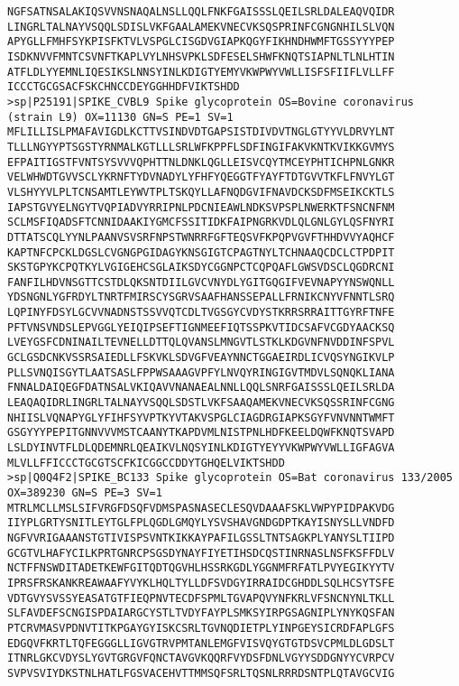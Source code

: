 \documentclass[en,black,12pt,normal]{elegantnote}
\begin{document}
\begin{lstlisting}
NGFSATNSALAKIQSVVNSNAQALNSLLQQLFNKFGAISSSLQEILSRLDALEAQVQIDR
LINGRLTALNAYVSQQLSDISLVKFGAALAMEKVNECVKSQSPRINFCGNGNHILSLVQN
APYGLLFMHFSYKPISFKTVLVSPGLCISGDVGIAPKQGYFIKHNDHWMFTGSSYYYPEP
ISDKNVVFMNTCSVNFTKAPLVYLNHSVPKLSDFESELSHWFKNQTSIAPNLTLNLHTIN
ATFLDLYYEMNLIQESIKSLNNSYINLKDIGTYEMYVKWPWYVWLLISFSFIIFLVLLFF
ICCCTGCGSACFSKCHNCCDEYGGHHDFVIKTSHDD
>sp|P25191|SPIKE_CVBL9 Spike glycoprotein OS=Bovine coronavirus (strain L9) OX=11130 GN=S PE=1 SV=1
MFLILLISLPMAFAVIGDLKCTTVSINDVDTGAPSISTDIVDVTNGLGTYYVLDRVYLNT
TLLLNGYYPTSGSTYRNMALKGTLLLSRLWFKPPFLSDFINGIFAKVKNTKVIKKGVMYS
EFPAITIGSTFVNTSYSVVVQPHTTNLDNKLQGLLEISVCQYTMCEYPHTICHPNLGNKR
VELWHWDTGVVSCLYKRNFTYDVNADYLYFHFYQEGGTFYAYFTDTGVVTKFLFNVYLGT
VLSHYYVLPLTCNSAMTLEYWVTPLTSKQYLLAFNQDGVIFNAVDCKSDFMSEIKCKTLS
IAPSTGVYELNGYTVQPIADVYRRIPNLPDCNIEAWLNDKSVPSPLNWERKTFSNCNFNM
SCLMSFIQADSFTCNNIDAAKIYGMCFSSITIDKFAIPNGRKVDLQLGNLGYLQSFNYRI
DTTATSCQLYYNLPAANVSVSRFNPSTWNRRFGFTEQSVFKPQPVGVFTHHDVVYAQHCF
KAPTNFCPCKLDGSLCVGNGPGIDAGYKNSGIGTCPAGTNYLTCHNAAQCDCLCTPDPIT
SKSTGPYKCPQTKYLVGIGEHCSGLAIKSDYCGGNPCTCQPQAFLGWSVDSCLQGDRCNI
FANFILHDVNSGTTCSTDLQKSNTDIILGVCVNYDLYGITGQGIFVEVNAPYYNSWQNLL
YDSNGNLYGFRDYLTNRTFMIRSCYSGRVSAAFHANSSEPALLFRNIKCNYVFNNTLSRQ
LQPINYFDSYLGCVVNADNSTSSVVQTCDLTVGSGYCVDYSTKRRSRRAITTGYRFTNFE
PFTVNSVNDSLEPVGGLYEIQIPSEFTIGNMEEFIQTSSPKVTIDCSAFVCGDYAACKSQ
LVEYGSFCDNINAILTEVNELLDTTQLQVANSLMNGVTLSTKLKDGVNFNVDDINFSPVL
GCLGSDCNKVSSRSAIEDLLFSKVKLSDVGFVEAYNNCTGGAEIRDLICVQSYNGIKVLP
PLLSVNQISGYTLAATSASLFPPWSAAAGVPFYLNVQYRINGIGVTMDVLSQNQKLIANA
FNNALDAIQEGFDATNSALVKIQAVVNANAEALNNLLQQLSNRFGAISSSLQEILSRLDA
LEAQAQIDRLINGRLTALNAYVSQQLSDSTLVKFSAAQAMEKVNECVKSQSSRINFCGNG
NHIISLVQNAPYGLYFIHFSYVPTKYVTAKVSPGLCIAGDRGIAPKSGYFVNVNNTWMFT
GSGYYYPEPITGNNVVVMSTCAANYTKAPDVMLNISTPNLHDFKEELDQWFKNQTSVAPD
LSLDYINVTFLDLQDEMNRLQEAIKVLNQSYINLKDIGTYEYYVKWPWYVWLLIGFAGVA
MLVLLFFICCCTGCGTSCFKICGGCCDDYTGHQELVIKTSHDD
>sp|Q0Q4F2|SPIKE_BC133 Spike glycoprotein OS=Bat coronavirus 133/2005 OX=389230 GN=S PE=3 SV=1
MTRLMCLLMSLSIFVRGFDSQFVDMSPASNASECLESQVDAAAFSKLVWPYPIDPAKVDG
IIYPLGRTYSNITLEYTGLFPLQGDLGMQYLYSVSHAVGNDGDPTKAYISNYSLLVNDFD
NGFVVRIGAAANSTGTIVISPSVNTKIKKAYPAFILGSSLTNTSAGKPLYANYSLTIIPD
GCGTVLHAFYCILKPRTGNRCPSGSDYNAYFIYETIHSDCQSTINRNASLNSFKSFFDLV
NCTFFNSWDITADETKEWFGITQDTQGVHLHSSRKGDLYGGNMFRFATLPVYEGIKYYTV
IPRSFRSKANKREAWAAFYVYKLHQLTYLLDFSVDGYIRRAIDCGHDDLSQLHCSYTSFE
VDTGVYSVSSYEASATGTFIEQPNVTECDFSPMLTGVAPQVYNFKRLVFSNCNYNLTKLL
SLFAVDEFSCNGISPDAIARGCYSTLTVDYFAYPLSMKSYIRPGSAGNIPLYNYKQSFAN
PTCRVMASVPDNVTITKPGAYGYISKCSRLTGVNQDIETPLYINPGEYSICRDFAPLGFS
EDGQVFKRTLTQFEGGGLLIGVGTRVPMTANLEMGFVISVQYGTGTDSVCPMLDLGDSLT
ITNRLGKCVDYSLYGVTGRGVFQNCTAVGVKQQRFVYDSFDNLVGYYSDDGNYYCVRPCV
SVPVSVIYDKSTNLHATLFGSVACEHVTTMMSQFSRLTQSNLRRRDSNTPLQTAVGCVIG

\end{lstlisting}
\end{document}
